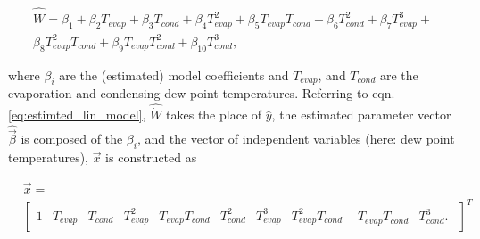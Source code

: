 \begin{equation}
\begin{gathered}
  \hat {\dot W} = {\beta _1} + {\beta _2}{T_{evap}} + {\beta _3}{T_{cond}} + {\beta _4}T_{evap}^2 + {\beta _5}{T_{evap}}{T_{cond}} + {\beta _6}T_{cond}^2 + {\beta _7}T_{evap}^3 + \\
  {\beta _8}T_{evap}^2{T_{cond}} + {\beta _9}{T_{evap}}T_{cond}^2   + {\beta _{10}}T_{cond}^3 ,
\end{gathered} 
\label{eq:pwr_map_definition}
\end{equation}

where $\beta_i$ are the (estimated) model coefficients and $T_{evap}$, and $T_{cond}$ are the evaporation and condensing dew point temperatures. Referring to eqn. \ref{eq:estimted_lin_model}, $\hat {\dot W}$ takes the place of $\hat y$, the estimated parameter vector  $\hat {\vec \beta}$ is composed of the $\beta_i$, and the vector of independent variables (here: dew point temperatures), $\vec x$ is constructed as

\begin{equation}
\begin{split}
&\vec x = \\
&{\left[ {\begin{array}{*{20}{c}}
  1&{{T_{evap}}}&{{T_{cond}}}&{T_{evap}^2}&{{T_{evap}}{T_{cond}}}&{T_{cond}^2}&{T_{evap}^3}&{T_{evap}^2{T_{cond}}}&{\begin{array}{*{20}{c}}
  {{T_{evap}}{T_{cond}}}&{T_{cond}^3} .
\end{array}} 
\end{array}} \right]^T}
\end{split}
\label{eq:lin_reg_temp_vec}
\end{equation}
